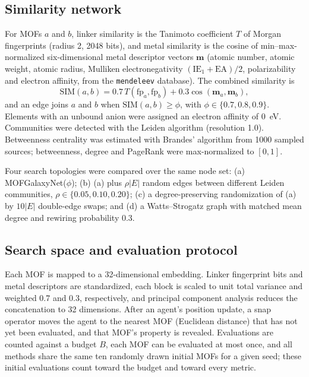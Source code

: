 \documentclass[journal=jcisd8,manuscript=article]{achemso}
\begin{document}
\subsection{Similarity network}
For MOFs $a$ and $b$, linker similarity is the Tanimoto coefficient $T$ of Morgan fingerprints\cite{rogers2010ecfp} (radius 2, 2048 bits), and metal similarity is the cosine of min--max-normalized six-dimensional metal descriptor vectors $\mathbf{m}$ (atomic number, atomic weight, atomic radius, Mulliken electronegativity $(\mathrm{IE}_1+\mathrm{EA})/2$, polarizability and electron affinity, from the \texttt{mendeleev} database\cite{mendeleev}). The combined similarity is
\begin{equation}
\mathrm{SIM}(a,b)=0.7\,T(\mathrm{fp}_a,\mathrm{fp}_b)+0.3\cos(\mathbf{m}_a,\mathbf{m}_b),
\label{eq:sim}
\end{equation}
and an edge joins $a$ and $b$ when $\mathrm{SIM}(a,b)\geq\phi$, with $\phi\in\{0.7,0.8,0.9\}$. Elements with an unbound anion were assigned an electron affinity of 0~eV. Communities were detected with the Leiden algorithm\cite{traag2019leiden} (resolution 1.0). Betweenness centrality was estimated with Brandes' algorithm\cite{brandes2001faster} from 1000 sampled sources; betweenness, degree and PageRank were max-normalized to $[0,1]$.

Four search topologies were compared over the same node set: (a) MOFGalaxyNet($\phi$); (b) (a) plus $\rho|E|$ random edges between different Leiden communities, $\rho\in\{0.05,0.10,0.20\}$; (c) a degree-preserving randomization of (a) by $10|E|$ double-edge swaps;\cite{maslov2002specificity} and (d) a Watts--Strogatz graph with matched mean degree and rewiring probability 0.3.\cite{watts1998small}

\subsection{Search space and evaluation protocol}
Each MOF is mapped to a 32-dimensional embedding. Linker fingerprint bits and metal descriptors are standardized, each block is scaled to unit total variance and weighted 0.7 and 0.3, respectively, and principal component analysis reduces the concatenation to 32 dimensions. After an agent's position update, a snap operator moves the agent to the nearest MOF (Euclidean distance) that has not yet been evaluated, and that MOF's property is revealed. Evaluations are counted against a budget $B$, each MOF can be evaluated at most once, and all methods share the same ten randomly drawn initial MOFs for a given seed; these initial evaluations count toward the budget and toward every metric.
\end{document}
